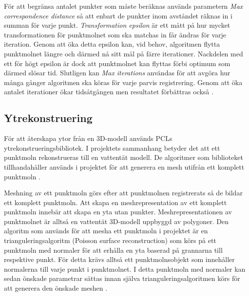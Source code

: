 För att begränsa antalet punkter som måste beräknas används parametern \textit{Max correspondence distance} så att enbart de punkter inom avståndet räknas in i summan för varje punkt. \textit{Transformation epsilon} är ett mått på hur mycket transformationen för punktmolnet som ska matchas in får ändras för varje iteration. Genom att öka detta epsilon kan, vid behov, algoritmen flytta punktmolnet längre och därmed nå sitt mål på färre iterationer. Nackdelen med ett för högt epsilon är dock att punktmolnet kan flyttas förbi optimum som därmed slösar tid. Slutligen kan \textit{Max iterations} användas för att avgöra hur många gånger algoritmen ska köras för varje parvis registrering. Genom att öka antalet iterationer ökar tidsåtgången men resultatet förbättras också \cite{pcl_icp_docs}.

\subsection{Ytrekonstruering}
För att återskapa ytor från en 3D-modell används PCLs ytrekonstrueringsbibliotek. I projektets sammanhang betyder det att ett punktmoln rekonstrueras till en vattentät modell. De algoritmer som biblioteket tillhandahåller används i projektet för att generera en mesh utifrån ett komplett punktmoln \cite{pcl_surface_reconstruction}.  



Meshning av ett punktmoln görs efter att punktmolnen registrerats så de bildar ett komplett punktmoln. Att skapa en meshrepresentation av ett komplett punktmoln innebär att skapa en yta utan punkter. Meshrepresentationen av punktmolnet är alltså en vattentät 3D-modell uppbyggd av polygoner. Den algoritm som används för att mesha ett punktmoln i projektet är en trianguleringsalgoritm (Poisson surface reconstruction) som körs på ett punktmoln med normaler för att erhålla en yta baserad på grannarna till respektive punkt. För detta krävs alltså ett punktmolnsobjekt som innehåller normalerna till varje punkt i punktmolnet. I detta punktmoln med normaler kan sedan önskade parametrar sättas innan själva trianguleringsalgoritmen körs för att generera den önskade meshen \cite{pcl_surface_reconstruction}\cite{pcl_triangulation_algorithm}. 


